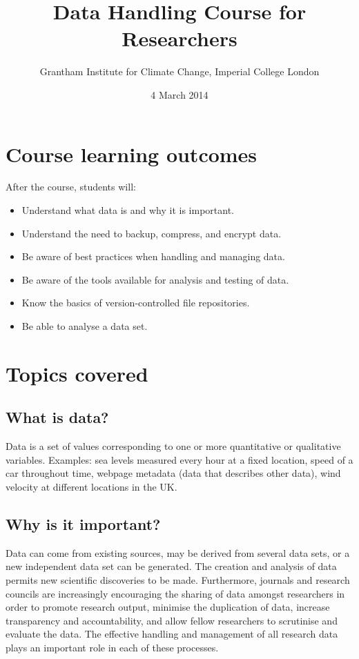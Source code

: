 \documentclass[a4paper,11pt]{article}
\title{Data Handling Course for Researchers}
\date{4 March 2014}
\author{Grantham Institute for Climate Change, Imperial College London}
\begin{document}
\maketitle
\setlength{\parskip}{0.3cm}
\setlength{\parindent}{0cm}

\section{Course learning outcomes}
After the course, students will:
\begin{itemize}
   \item Understand what data is and why it is important.
   \item Understand the need to backup, compress, and encrypt data.
   \item Be aware of best practices when handling and managing data.
   \item Be aware of the tools available for analysis and testing of data.
   \item Know the basics of version-controlled file repositories.
   \item Be able to analyse a data set.
\end{itemize}

\section{Topics covered}

\subsection{What is data?}
Data is a set of values corresponding to one or more quantitative or qualitative variables. Examples: sea levels measured every hour at a fixed location, speed of a car throughout time, webpage metadata (data that describes other data), wind velocity at different locations in the UK. 

\subsection{Why is it important?}
Data can come from existing sources, may be derived from several data sets, or a new independent data set can be generated. The creation and analysis of data permits new scientific discoveries to be made. Furthermore, journals and research councils are increasingly encouraging the sharing of data amongst researchers in order to promote research output, minimise the duplication of data, increase transparency and accountability, and allow fellow researchers to scrutinise and evaluate the data. The effective handling and management of all research data plays an important role in each of these processes.
\end{document}
